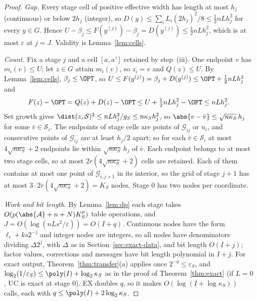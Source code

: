 \begin{proof}
\emph{Gap.} Every stage cell of positive effective width has length at most
$h_j$ (continuous) or below $2h_j$ (integer), so
$D(y)\le\sum_iL_i(2h_j)^2/8\le\frac12nLh_j^2$ for every $y\in G$. Hence
$U-\beta_j\le F(y^{(j)})-\beta_j=D(y^{(j)})\le\frac12nLh_j^2$, which is at
most $\varepsilon$ at $j=J$. Validity is Lemma~\ref{lem:cells}.

\emph{Count.} Fix a stage $j$ and a cell $[a,a']$ retained by step~(iii).
One endpoint $v$ has $m_i(v)\le U$; let $z\in G$ attain $m_i(v)$, so $z_i=v$
and $Q(z)\le U$. By Lemma~\ref{lem:cells}, $\beta_j\le\OPT$, so
$U\le F(y^{(j)})=\beta_j+D(y^{(j)})\le\OPT+\frac12nLh_j^2$ and
\[
F(z)-\OPT=Q(z)+D(z)-\OPT\le U+\tfrac12nLh_j^2-\OPT\le nLh_j^2 .
\]
Set growth gives $\dist(z,\mathcal S)^2\le nLh_j^2/g_S\le n\kappa_Sh_j^2$, so
$\abs{v-\bar v}\le\sqrt{n\kappa_S}\,h_j$ for some $\bar v\in\mathcal S_i$.
The endpoints of stage cells are points of $\mathcal G_{ij}$ or $u_i$, and
consecutive points of $\mathcal G_{ij}$ are at least $h_j/2$ apart; so for
each $\bar v\in\mathcal S_i$ at most $4\sqrt{n\kappa_S}+2$ endpoints lie
within $\sqrt{n\kappa_S}\,h_j$ of $\bar v$. Each endpoint belongs to at most
two stage cells, so at most $2r(4\sqrt{n\kappa_S}+2)$ cells are retained.
Each of them contains at most one point of $\mathcal G_{i,j+1}$ in its
interior, so the grid of stage $j+1$ has at most
$3\cdot2r(4\sqrt{n\kappa_S}+2)=K_S$ nodes. Stage $0$ has two nodes per
coordinate.

\emph{Work and bit length.} By Lemma~\ref{lem:dp} each stage takes
$O(p(\abs{\mathcal A}+n+N)K_S^p)$ table operations, and
$J=O(\log(nLs^2/\varepsilon))=O(I+q)$. Continuous nodes have the form
$\ell_i+ks2^{-j}$ and integer nodes are integers, so all nodes have
denominators dividing $\Delta2^j$, with $\Delta$ as in
Section~\ref{sec:exact-data}, and bit length $O(I+j)$; factor values,
corrections and messages have bit length polynomial in $I+j$. For exact
output, Theorem~\ref{thm:transfer}(a) applies once $2^{-q}\le\varepsilon_S$,
and $\log_2(1/\varepsilon_S)\le\poly(I)+\log_2\kappa_S$ as in the proof of
Theorem~\ref{thm:exact} (if $L=0$, UC is exact at stage $0$). EX doubles $q$,
so it makes $O(\log(I+\log\kappa_S))$ calls, each with
$q\le\poly(I)+2\log_2\kappa_S$.
\end{proof}

